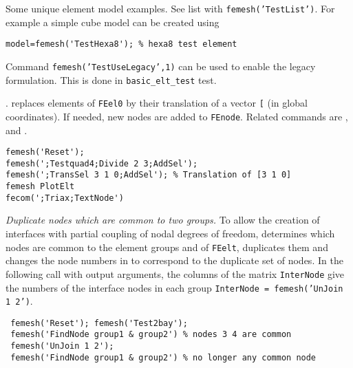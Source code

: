 
Some unique element model examples. See list with {\tt femesh('TestList')}.
For example a simple cube model can be created using\\
\begin{verbatim}
model=femesh('TestHexa8'); % hexa8 test element
\end{verbatim}%

\begin{SDTDEV}
\color{red}
Command {\tt femesh('TestUseLegacy',1)} can be used to enable the legacy formulation. This is done in {\tt basic\_elt\_test} test.
\color{black}
\end{SDTDEV}


.   replaces elements of {\tt FEel0} by their translation of a vector {\tt [}\tsi{tx ty tz}{\tt ]} (in global coordinates).  If needed, new nodes are added to {\tt FEnode}.  Related commands are ,  and .

\begin{verbatim}
femesh('Reset');
femesh(';Testquad4;Divide 2 3;AddSel'); 
femesh(';TransSel 3 1 0;AddSel'); % Translation of [3 1 0]
femesh PlotElt
fecom(';Triax;TextNode')
\end{verbatim}%



{\sl Duplicate nodes which are common to two groups.} To allow the creation of interfaces with partial coupling of nodal degrees of freedom,  determines which nodes are common to the element groups  and  of {\tt FEelt}, duplicates them and changes the node numbers in  to correspond to the duplicate set of nodes. In the following call with output arguments, the columns of the matrix {\tt InterNode} give the numbers of the interface nodes in each group {\tt InterNode = femesh('UnJoin 1 2')}.

\begin{verbatim}
 femesh('Reset'); femesh('Test2bay');
 femesh('FindNode group1 & group2') % nodes 3 4 are common
 femesh('UnJoin 1 2');
 femesh('FindNode group1 & group2') % no longer any common node
\end{verbatim}%

